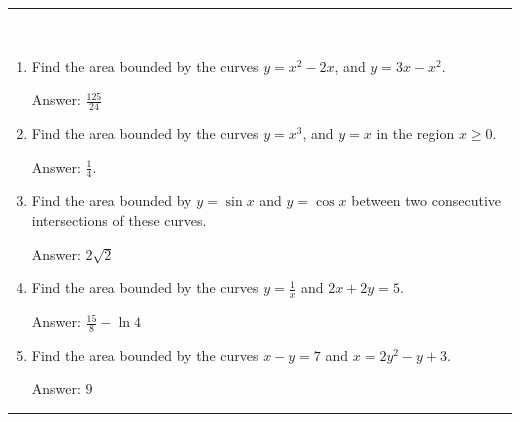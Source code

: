 \documentclass[calc1-main.tex]{subfiles}
\begin{document}
\rule{\textwidth}{1pt}
\begin{multicols}{2}
\begin{exercise}
~\\
  \begin{enumerate}
    \item Find the area bounded by the curves $y=x^2-2x$, and $y=3x-x^2$.

    Answer: $\frac{125}{24}$

    \item Find the area bounded by the curves $y=x^3$, and $y=x$ in the region $x \ge 0$.

    Answer: $\frac{1}{4}$.

    \item Find the area bounded by $y= \sin x$ and $y= \cos x$ between two consecutive intersections of these curves.

    Answer: $2\sqrt{2}$

    \item Find the area bounded by the curves $y=\frac{1}{x}$ and $2x+2y = 5$.

    Answer: $\frac{15}{8} - \ln4$

    \item Find the area bounded by the curves $x-y=7$ and $x=2y^2-y+3$.

    Answer: $9$
  \end{enumerate}
\end{exercise}
\end{multicols}
\rule{\textwidth}{1pt}
\end{document}
